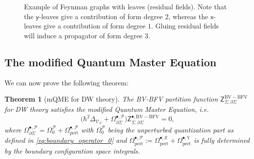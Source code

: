 \documentclass[11pt,colorinlistoftodos]{amsart}
\numberwithin{equation}{subsection}
\newcommand*\circled[1]{\tikz[baseline=(char.base)]{
            \node[shape=circle,draw,inner sep=2pt] (char) {#1};}}
\theoremstyle{plain}
\newtheorem{thm}{Theorem}[subsection]
\theoremstyle{definition}
\theoremstyle{remark}
\newcommand{\de}{\partial}
\newcommand{\calP}{\mathcal{P}}
\newcommand{\calV}{\mathcal{V}}
\begin{document}
\begin{figure}[h!]
    \caption{Example of Feynman graphs with leaves (residual fields). Note that the $\mathsf{y}$-leaves give a contribution of form degree 2, whereas the $\mathsf{x}$-leaves give a contribution of form degree $1$. Gluing residual fields will induce a propagator of form degree $3$.}
    \label{fig:Feynman_graphs_4}
\end{figure}


\subsection{The modified Quantum Master Equation}
We can now prove the following theorem:
\begin{thm}[mQME for DW theory]
\label{thm:mQME_DW}
The BV-BFV partition function $\mathsf{Z}^{\scriptscriptstyle\mathrm{BV-BFV}}_{\Sigma,\de\Sigma}$ for DW theory satisfies the modified Quantum Master Equation, i.e.
\[
\big(\hbar^2\Delta_{\calV_\Sigma}+\Omega^{\bullet,\calP}_{\de\Sigma}\big)\mathsf{Z}^{\bullet,\scriptscriptstyle\mathrm{BV-BFV}}_{\Sigma,\de\Sigma}=0,
\]
where $\Omega^{\bullet,\calP}_{\de\Sigma}=\Omega_0^\calP+\Omega^{\bullet,\calP}_\mathrm{pert}$ with $\Omega_0^\calP$ being the unperturbed quantization part as defined in \eqref{eq:boundary_operator_0} and $\Omega^{\bullet,\calP}_\mathrm{pert}:=\Omega^{\bullet,\mathds{X}}_\mathrm{pert}+\Omega^{\bullet,\mathds{Y}}_\mathrm{pert}$ is fully determined by the boundary configuration space integrals.
\end{thm}
\end{document}
